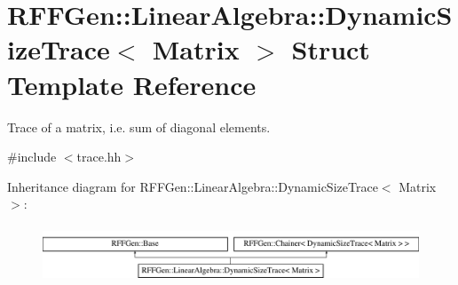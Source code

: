 \hypertarget{structRFFGen_1_1LinearAlgebra_1_1DynamicSizeTrace}{\section{R\-F\-F\-Gen\-:\-:Linear\-Algebra\-:\-:Dynamic\-Size\-Trace$<$ Matrix $>$ Struct Template Reference}
\label{structRFFGen_1_1LinearAlgebra_1_1DynamicSizeTrace}
}


Trace of a matrix, i.\-e. sum of diagonal elements.  




{\ttfamily \#include $<$trace.\-hh$>$}

Inheritance diagram for R\-F\-F\-Gen\-:\-:Linear\-Algebra\-:\-:Dynamic\-Size\-Trace$<$ Matrix $>$\-:\begin{figure}[H]
\begin{center}
\leavevmode
\includegraphics[height=1.723077cm]{structRFFGen_1_1LinearAlgebra_1_1DynamicSizeTrace}
\end{center}
\end{figure}
